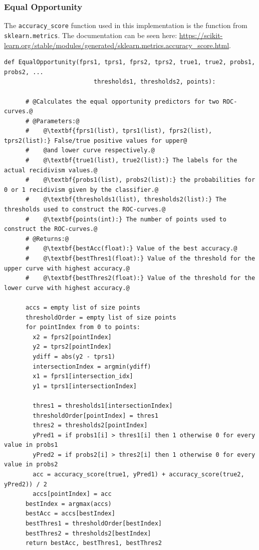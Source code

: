 \documentclass[11pt, fleqn, titlepage]{article}
\begin{document}
	\subsubsection{Equal Opportunity}\label{Pseudo Equal}
	The \texttt{accuracy\_score} function used in this implementation is the function from \texttt{sklearn.metrics}. The documentation can be seen here: \url{https://scikit-learn.org/stable/modules/generated/sklearn.metrics.accuracy_score.html}.
	\begin{lstlisting}[escapechar=@,escapebegin=\itshape]
	def EqualOpportunity(fprs1, tprs1, fprs2, tprs2, true1, true2, probs1, probs2, ...
	                     thresholds1, thresholds2, points):
	                     
	  # @Calculates the equal opportunity predictors for two ROC-curves.@
  	  # @Parameters:@
	  #    @\textbf{fprs1(list), tprs1(list), fprs2(list), tprs2(list):} False/true positive values for upper@
	  #    @and lower curve respectively.@
	  #    @\textbf{true1(list), true2(list):} The labels for the actual recidivism values.@
	  #    @\textbf{probs1(list), probs2(list):} the probabilities for 0 or 1 recidivism given by the classifier.@
	  #    @\textbf{thresholds1(list), thresholds2(list):} The thresholds used to construct the ROC-curves.@
	  #    @\textbf{points(int):} The number of points used to construct the ROC-curves.@
	  # @Returns:@
	  #    @\textbf{bestAcc(float):} Value of the best accuracy.@
	  #    @\textbf{bestThres1(float):} Value of the threshold for the upper curve with highest accuracy.@
	  #    @\textbf{bestThres2(float):} Value of the threshold for the lower curve with highest accuracy.@
	  
	  accs = empty list of size points
	  thresholdOrder = empty list of size points
	  for pointIndex from 0 to points:
	    x2 = fprs2[pointIndex]
	    y2 = tprs2[pointIndex]
	    ydiff = abs(y2 - tprs1)
	    intersectionIndex = argmin(ydiff)
	    x1 = fprs1[intersection_idx]
	    y1 = tprs1[intersectionIndex]
	  
	    thres1 = thresholds1[intersectionIndex]
	    thresholdOrder[pointIndex] = thres1
	    thres2 = thresholds2[pointIndex]
	    yPred1 = if probs1[i] > thres1[i] then 1 otherwise 0 for every value in probs1
	    yPred2 = if probs2[i] > thres2[i] then 1 otherwise 0 for every value in probs2
	    acc = accuracy_score(true1, yPred1) + accuracy_score(true2, yPred2)) / 2
	    accs[pointIndex] = acc
	  bestIndex = argmax(accs)
	  bestAcc = accs[bestIndex]
	  bestThres1 = thresholdOrder[bestIndex]
	  bestThres2 = thresholds2[bestIndex]
	  return bestAcc, bestThres1, bestThres2
	  
	\end{lstlisting}
	
\end{document}
